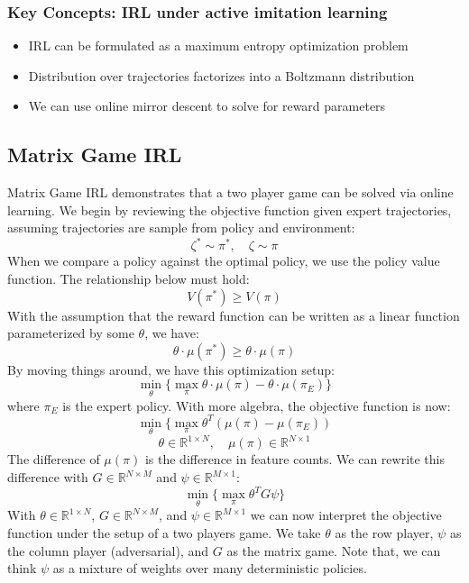 \documentclass[11pt]{article}
\begin{document}
\subsubsection{Key Concepts: IRL under active imitation learning}
\begin{itemize}
    \item IRL can be formulated as a maximum entropy optimization problem
    \item Distribution over trajectories factorizes into a Boltzmann distribution
    \item We can use online mirror descent to solve for reward parameters
\end{itemize}

\subsection{Matrix Game IRL}
Matrix Game IRL demonstrates that a two player game can be solved via online learning. We begin by reviewing the objective function given expert trajectories, assuming trajectories are sample from policy and environment:
\[\zeta^* \sim \pi^* ,\quad \zeta \sim \pi\]
When we compare a policy against the optimal policy, we use the policy value function. The relationship below must hold:
\[V(\pi^*) \geq V(\pi)\]
With the assumption that the reward function can be written as a linear function parameterized by some \(\theta\), we have:
\[\theta \cdot \mu(\pi^*) \geq \theta \cdot \mu(\pi) \]
By moving things around, we have this optimization setup:
\[\min_\theta\{\max_\pi \theta \cdot \mu(\pi) - \theta \cdot \mu(\pi_E)\}\]
where \(\pi_E\) is the expert policy. With more algebra, the objective function is now:
\[\min_\theta\{\max_\pi \theta^T (\mu(\pi) - \mu(\pi_E))\]
\[\theta \in \mathbb{R}^{1 \times N},\quad \mu(\pi) \in \mathbb{R}^{N\times 1}\]
The difference of \(\mu(\pi)\) is the difference in feature counts. We can rewrite this difference with \(G \in \mathbb{R}^{N \times M}\) and \(\psi \in \mathbb{R}^{M \times 1}\):
\[\min_\theta\{\max_\pi \theta^T G \psi\}\]
With \(\theta \in \mathbb{R}^{1 \times N}\), \(G \in \mathbb{R}^{N \times M}\), and \(\psi \in \mathbb{R}^{M \times 1}\) we can now interpret the objective function under the setup of a two players game. We take \(\theta\) as the row player, \(\psi\) as the column player (adversarial), and \(G\) as the matrix game. Note that, we can think \(\psi\) as a mixture of weights over many deterministic policies.
\end{document}
